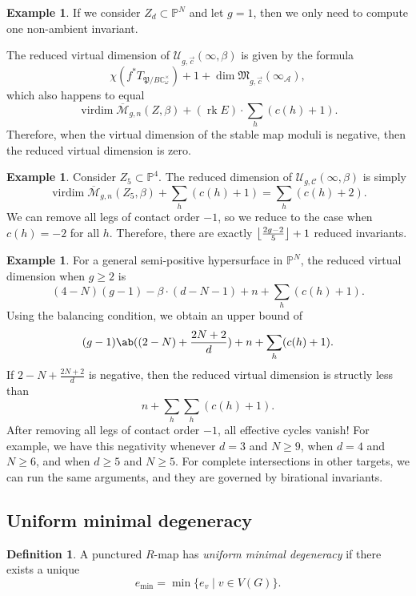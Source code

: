 \documentclass[10pt]{amsart}
\DeclarePairedDelimiter{\floor}{\lfloor}{\rfloor}
\theoremstyle{definition}
\newtheorem{defn}[thm]{Definition}
\newtheorem{exm}[thm]{Example}
\theoremstyle{remark}
\theoremstyle{plain}
\theoremstyle{definition}
\theoremstyle{remark}
\newcommand{\C}{\mathbb{C}}
\renewcommand{\P}{\mathbb{P}}
\newcommand{\Mbar}{\overline{\mathcal{M}}}
\newcommand{\mc}[1]{\mathcal{#1}}
\newcommand{\mf}[1]{\mathfrak{#1}}
\newcommand{\on}[1]{\operatorname{#1}}
\newcommand{\1}{\mathbf{1}}
\newcommand{\2}{\mathbf{2}}
\newcommand{\3}{\mathbf{3}}
\begin{document}
\begin{exm}
    If we consider $Z_d \subset \P^N$ and let $g=1$, then we only need to compute one non-ambient invariant.
\end{exm}

The reduced virtual dimension of $\mc{U}_{g, \vec{c}}(\infty,\beta)$ is given by the formula
\[ \chi(f^* T_{\mf{P}/B \C_{\omega}^{\times}}) + 1 + \dim \mf{M}_{g,\vec{c}}(\infty_{\mc{A}}), \]
which also happens to equal
\[ \on{virdim} \Mbar_{g,n}(Z,\beta) + (\on{rk} E) \cdot \sum_h (c(h)+1). \]
Therefore, when the virtual dimension of the stable map moduli is negative, then the reduced virtual dimension is zero.

\begin{exm}
    Consider $Z_5 \subset \P^4$. The reduced dimension of $\mc{U}_{g,\mc{C}}(\infty, \beta)$ is simply
    \[ \on{virdim} \Mbar_{g,n}(Z_5, \beta) + \sum_h (c(h)+1) = \sum_h (c(h)+2). \]
    We can remove all legs of contact order $-1$, so we reduce to the case when $c(h) = -2$ for all $h$. Therefore, there are exactly $\floor*{ \frac{2g-2}{5} }+ 1$ reduced invariants. 
\end{exm}

\begin{exm}
    For a general semi-positive hypersurface in $\P^N$, the reduced virtual dimension when $g \geq 2$ is
    \[ (4-N)(g-1) - \beta \cdot (d-N-1) + n + \sum_h (c(h)+1). \]
    Using the balancing condition, we obtain an upper bound of
    \[ (g-1) \ab((2-N) + \frac{2N+2}{d}) + n + \sum_h (c(h)+1). \]
    If $2-N + \frac{2N+2}{d}$ is negative, then the reduced virtual dimension is structly less than
    \[ n + \sum_h \sum_h (c(h)+1). \]
    After removing all legs of contact order $-1$, all effective cycles vanish! For example, we have this negativity whenever $d=3$ and $N \geq 9$, when $d=4$ and $N \geq 6$, and when $d \geq 5$ and $N \geq 5$. For complete intersections in other targets, we can run the same arguments, and they are governed by birational invariants.
\end{exm}

\subsection{Uniform minimal degeneracy}%
\label{sub:Uniform minimal degeneracy}

\begin{defn}
    A punctured $R$-map has \textit{uniform minimal degeneracy} if there exists a unique
    \[ e_{\min} = \min \{ e_v \mid v \in V(G) \}. \]
\end{defn}
\end{document}
